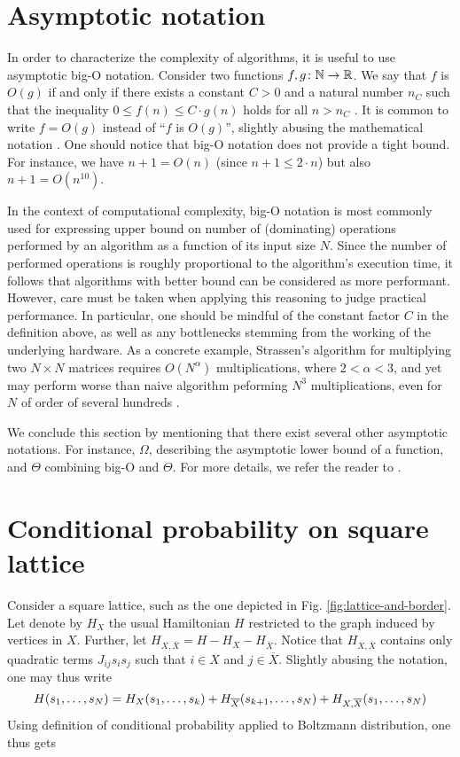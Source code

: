 \chapter{Asymptotic notation}

In order to characterize the complexity of algorithms, it is useful to use
asymptotic big-O notation. Consider two functions $f, g \colon \mathbb{N} \to \mathbb{R}$. We
say that $f$ is $O(g)$ if and only if there exists a constant $C > 0$ and a
natural number $n_{C}$ such that the inequality $0 \le f(n) \le C\cdot g(n)$
holds for all $n > n_{C}$ \cite{clrs}. It is common to write $f=O(g)$ instead
of ``$f$ is $O(g)$'', slightly abusing the mathematical notation \cite{clrs}.
One should notice that big-O notation does not provide a tight bound. For
instance, we have $n + 1 = O(n)$ (since $n + 1 \le 2 \cdot n$) but also $n+1 =
  O(n^{10})$.

In the context of computational complexity, big-O notation is most commonly
used for expressing upper bound on number of (dominating) operations performed
by an algorithm as a function of its input size $N$. Since the number of
performed operations is roughly proportional to the algorithm's execution time,
it follows that algorithms with better bound can be considered as more
performant. However, care must be taken when applying this reasoning to judge
practical performance. In particular, one should be mindful of the constant
factor $C$ in the definition above, as well as any bottlenecks stemming from
the working of the underlying hardware. As a concrete example, Strassen's
algorithm for multiplying two $N \times N$ matrices requires $O(N^{\alpha})$
multiplications, where $2 < \alpha < 3$, and yet may perform worse than naive
algorithm peforming $N^{3}$ multiplications, even for $N$ of order of several
hundreds \cite{dalberto}.

We conclude this section by mentioning that there exist several other
asymptotic notations. For instance, $\Omega$, describing the asymptotic lower bound
of a function, and $\Theta$ combining big-O and $\Theta$. For more details, we
refer the reader to \cite{clrs}.

\chapter{Conditional probability on square lattice}
\label{sec:probability}
Consider a square lattice, such as the one depicted in Fig. \ref{fig:lattice-and-border}.
Let denote by $H_X$ the usual Hamiltonian $H$ restricted to the graph
induced by vertices in $X$. Further, let $H_{X, \overline{X}} = H - H_X -
  H_{\overline{X}}$. Notice that $H_{X, \overline{X}}$ contains only quadratic
terms $J_{ij} s_i s_j$ such that $i \in X$ and $j \in \overline{X}$. Slightly
abusing the notation, one may thus write
\begin{equation}
  \small
  H(s_1, \ldots, s_N) = H_X(s_1, \ldots, s_k) + H_{\overline{X}}(s_{k+1}, \ldots, s_N) + H_{X, \overline{X}}(s_1, \ldots, s_N)
\end{equation}
Using definition of conditional probability applied to Boltzmann distribution,
one thus gets

